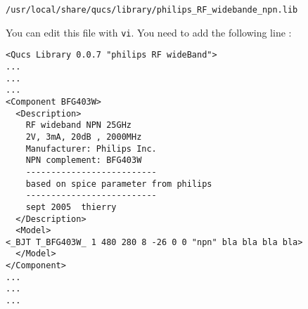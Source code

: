 \begin{verbatim}
/usr/local/share/qucs/library/philips_RF_widebande_npn.lib
\end{verbatim}

You can edit this file with \texttt{vi}. You need to add the following line :
\begin{verbatim}
<Qucs Library 0.0.7 "philips RF wideBand">
...
...
...
<Component BFG403W>
  <Description>
    RF wideband NPN 25GHz 
    2V, 3mA, 20dB , 2000MHz
    Manufacturer: Philips Inc.
    NPN complement: BFG403W
    --------------------------
    based on spice parameter from philips
    --------------------------
    sept 2005  thierry
  </Description>
  <Model>
<_BJT T_BFG403W_ 1 480 280 8 -26 0 0 "npn" bla bla bla bla>
  </Model>
</Component>
...
...
...
\end{verbatim}




